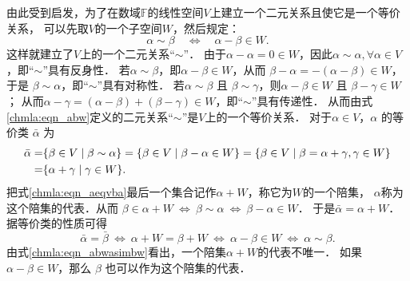 由此受到启发，为了在数域$\mathbb{F}$的线性空间$V$上建立一个二元关系且使它是一个等价关系，
可以先取$V$的一个子空间$W$，然后规定：
\begin{equation}\label{chmla:eqn_abw}
    \alpha \sim \beta \quad \Longleftrightarrow\quad  \alpha-\beta \in W .
\end{equation}
这样就建立了$V$上的一个二元关系“$\sim$”．
由于$\alpha-\alpha=0 \in W$，因此$\alpha \sim \alpha, \forall \alpha \in V$，即“$\sim$”具有反身性．
若$\alpha \sim \beta$，即$\alpha-\beta \in W$，从而 $\beta-\alpha=-(\alpha-\beta) \in W$，
于是 $\beta \sim \alpha$，即“$\sim$”具有对称性．
若$\alpha \sim \beta$ 且 $\beta\sim \gamma$，则$\alpha-\beta \in W$ 且 $\beta-\gamma \in W$；
从而$\alpha-\gamma=(\alpha-\beta)+(\beta-\gamma) \in W$，即“$\sim$”具有传递性．
从而由式\eqref{chmla:eqn_abw}定义的二元关系“$\sim$”是$V$上的一个{\kaishu 等价关系}．
对于$\alpha \in V$，$\alpha$ 的等价类 $\bar{\alpha}$ 为
\begin{align}
    \bar{\alpha} =&\{\beta \in V \mid \beta \sim \alpha\} 
     =\{\beta \in V \mid \beta-\alpha \in W\} 
     =\{\beta \in V  \mid \beta=\alpha+\gamma, \gamma \in W \} \notag \\
     =&\{\alpha+\gamma \mid \gamma \in W\} . \label{chmla:eqn_aeqvba}
\end{align}
把式\eqref{chmla:eqn_aeqvba}最后一个集合记作$\alpha+W$，称它为$W$的一个{\heiti 陪集}，
$\alpha$称为这个陪集的{\kaishu 代表}．从而
$\beta \in \alpha+W \ \Longleftrightarrow \ \beta \sim \alpha  \ \Longleftrightarrow \ \beta-\alpha \in W $．
于是$\bar{\alpha}= \alpha+W $．
据等价类的性质可得
\begin{equation}\label{chmla:eqn_abwasimbw}
    \bar{\alpha}=\bar{\beta}\ \Longleftrightarrow\  \alpha+W=\beta+W \ \Longleftrightarrow\ 
    \alpha-\beta \in W \ \Longleftrightarrow \  \alpha \sim \beta.
\end{equation}
由式\eqref{chmla:eqn_abwasimbw}看出，一个陪集$\alpha+W$的代表不唯一．
如果$\alpha-\beta \in W$，那么 $\beta$ 也可以作为这个陪集的代表．

